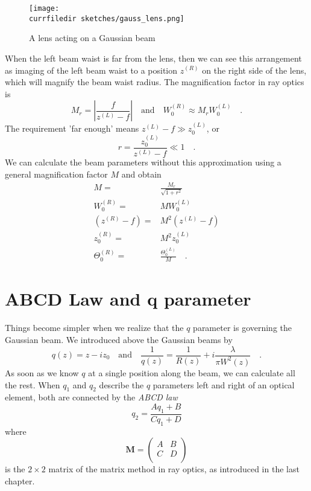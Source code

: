 \begin{figure}
    \texttt{[image: \\currfiledir sketches/gauss\_lens.png]}
   \caption{A lens acting on a Gaussian beam}
\end{figure}


When the left beam waist is far from the lens, then we can see this arrangement as imaging of the left beam waist to a position $z^{(R)}$ on the right side  of the lens, which will magnify the beam waist radius. The magnification factor in ray optics is 
\begin{equation}
    M_r = \left| \frac{f}{z^{(L)} -f}  \right| \quad \text{and} \quad W_0^{(R)} \approx M_r W_0^{(L)}  \quad .
\end{equation}
The requirement 'far enough' means $z^{(L)} - f \gg z_0^{(L)} $, or
\begin{equation}
    r = \frac{z_0^{(L)} }{z^{(L)}  - f} \ll 1 \quad .
\end{equation}
We can calculate the beam parameters without  this approximation using a general magnification factor $M$ and obtain
\begin{align}
    M = & \frac{M_r}{\sqrt{1 + r^2}} \\
    W_0^{(R)}  = & M W_0^{(L)}  \\
    (z^{(R)} - f) = &M^2 (z^{(L)} -f) \\
    z_0^{(R)} = & M^2 z_0^{(L)}  \\
    \Theta_0^{(R)} = & \frac{\Theta_0^{(L)} }{M} \quad .
\end{align}

\section{ABCD Law and q parameter}

Things become simpler when we realize that the $q$ parameter is governing the Gaussian beam. We introduced above the Gaussian beams by 
\begin{equation}
    q(z) = z - i z_0 \quad \text{and} \quad
    \frac{1}{q(z)} = \frac{1}{R(z)} + i \frac{\lambda}{\pi W^2(z)} \quad .
\end{equation} 
As soon as we know $q$ at a single position along the beam, we can calculate all the rest. When $q_1$  and $q_2$ describe the $q$ parameters left and right of an optical element, both are connected by the \emph{ABCD law}
\begin{equation}
    q_2 = \frac{A q_1 + B}{C q_1 + D}
\end{equation}
where 
\begin{equation}
\boldsymbol{M} = 
\begin{pmatrix}
    A & B \\ C & D \\
\end{pmatrix}
\end{equation}
is the $2\times2$ matrix of the matrix method in ray optics, as introduced in the last chapter.

